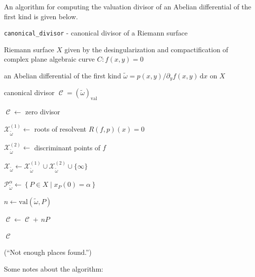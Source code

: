 \documentclass[12pt]{article}
\theoremstyle{definition}
\newcommand{\dx}{\,\mathrm{d}x}
\DeclareMathOperator{\DivC}{\mathcal{C}}
\begin{document}
An algorithm for computing the valuation divisor of an Abelian
differential of the first kind is given below.
\begin{algorithm}[H]
\caption{{\tt canonical\_divisor} - canonical divisor of a Riemann surface}
\label{alg:canonical}
\begin{algorithmic}[1]
  \Require Riemann surface $X$ given by the desingularization and
  compactification of complex plane algebraic curve $C : f(x,y) = 0$

  \Require an Abelian differential of the first kind $\tilde{\omega} =
  p(x,y) / \partial_y f(x,y) \dx$ on $X$

  \Ensure canonical divisor $\DivC = (\tilde{\omega})_\text{val}$

  \State $\DivC \gets$ zero divisor

  \State $\mathcal{X}_{\tilde{\omega}}^{(1)} \gets$ roots of resolvent
  $R(f,p)(x) = 0$

  \State $\mathcal{X}_{\tilde{\omega}}^{(2)} \gets$ discriminant points of $f$

  \State $\mathcal{X}_{\tilde{\omega}} \gets
  \mathcal{X}_{\tilde{\omega}}^{(1)} \cup
  \mathcal{X}_{\tilde{\omega}}^{(2)} \cup \{ \infty \}$


  \State $\mathcal{P}_{\tilde{\omega}}^\alpha \gets \left\{ P \in X \; |
  \; x_P(0) = \alpha \right\}$


  \State $n \gets \text{val}\left(\tilde{\omega},P\right)$

  \State $\DivC \gets \DivC + \,n P$

  \If{$\deg \DivC = 2g - 2$}
  \State \Return $\DivC$
  \EndIf

  \EndFor

  \EndFor

  (``Not enough places found.'')

\end{algorithmic}
\end{algorithm}
Some notes about the algorithm:
\end{document}
